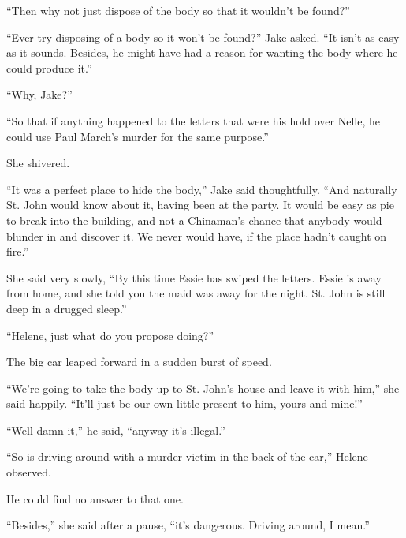 \documentclass{novel}
\begin{document}
“Then why not just dispose of the body so that it wouldn’t be found?”

“Ever try disposing of a body so it won’t be found?” Jake asked. “It isn’t as easy as it sounds. Besides, he might have had a reason for wanting the body where he could produce it.”

“Why, Jake?”

“So that if anything happened to the letters that were his hold over Nelle, he could use Paul March’s murder for the same purpose.”

She shivered.

“It was a perfect place to hide the body,” Jake said thoughtfully. “And naturally St. John would know about it, having been at the party. It would be easy as pie to break into the building, and not a Chinaman’s chance that anybody would blunder in and discover it. We never would have, if the place hadn’t caught on fire.”

She said very slowly, “By this time Essie has swiped the letters. Essie is away from home, and she told you the maid was away for the night. St. John is still deep in a drugged sleep.”

“Helene, just what do you propose doing?”

The big car leaped forward in a sudden burst of speed.

“We’re going to take the body up to St. John’s house and leave it with him,” she said happily. “It’ll just be our own little present to him, yours and mine!”

\vspace{2\nbs}
\clearpage
\thispagestyle{empty}

\begin{ChapterStart}
\vspace{3\nbs}
\end{ChapterStart}

“Well damn it,” he said, “anyway it’s illegal.”

“So is driving around with a murder victim in the back of the car,” Helene observed.

He could find no answer to that one.

“Besides,” she said after a pause, “it’s dangerous. Driving around, I mean.”
\end{document}
